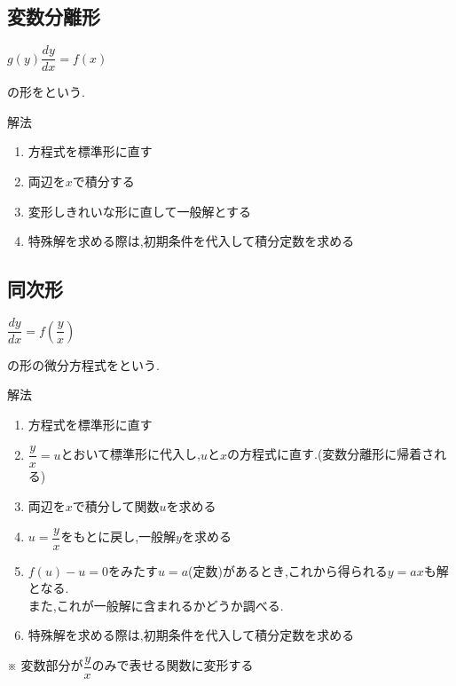 \documentclass[a4paper]{jsarticle}
\begin{document}
\subsection{変数分離形}
\begin{center}
    $g\left(y\right)\dfrac{dy}{dx}=f\left(x\right)$
\end{center}
の形をという.
\begin{itembox}[l]{解法}
    \begin{enumerate}[(1)]
        \item 方程式を標準形に直す
        \item 両辺を$x$で積分する
        \item 変形しきれいな形に直して一般解とする
        \item 特殊解を求める際は,初期条件を代入して積分定数を求める
    \end{enumerate}
\end{itembox}
\subsection{同次形}
\begin{center}
    $\dfrac{dy}{dx}=f\left(\dfrac{y}{x}\right)$
\end{center}
の形の微分方程式をという.
\begin{itembox}[l]{解法}
    \begin{enumerate}[(1)]
        \item 方程式を標準形に直す
        \item $\dfrac{y}{x}=u$とおいて標準形に代入し,$u$と$x$の方程式に直す.\quad(変数分離形に帰着される)
        \item 両辺を$x$で積分して関数$u$を求める
        \item $u=\dfrac{y}{x}$をもとに戻し,一般解$y$を求める
        \item $f\left(u\right)-u=0$をみたす$u=a$(定数)があるとき,これから得られる$y=ax$も解となる.\\
              また,これが一般解に含まれるかどうか調べる.
        \item 特殊解を求める際は,初期条件を代入して積分定数を求める
    \end{enumerate}
    ※ 変数部分が$\dfrac{y}{x}$のみで表せる関数に変形する\\
\end{itembox}
\end{document}
